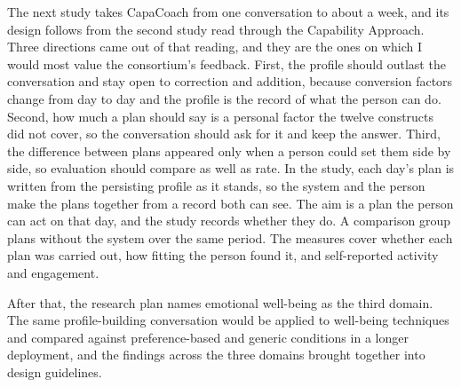 \documentclass[manuscript,screen,review]{acmart}
\begin{document}
The next study takes CapaCoach from one conversation to about a week, and its design follows from the second study read through the Capability Approach. Three directions came out of that reading, and they are the ones on which I would most value the consortium's feedback. First, the profile should outlast the conversation and stay open to correction and addition, because conversion factors change from day to day and the profile is the record of what the person can do. Second, how much a plan should say is a personal factor the twelve constructs did not cover, so the conversation should ask for it and keep the answer. Third, the difference between plans appeared only when a person could set them side by side, so evaluation should compare as well as rate. In the study, each day's plan is written from the persisting profile as it stands, so the system and the person make the plans together from a record both can see. The aim is a plan the person can act on that day, and the study records whether they do. A comparison group plans without the system over the same period. The measures cover whether each plan was carried out, how fitting the person found it, and self-reported activity and engagement.

After that, the research plan names emotional well-being as the third domain. The same profile-building conversation would be applied to well-being techniques and compared against preference-based and generic conditions in a longer deployment, and the findings across the three domains brought together into design guidelines.



\end{document}

